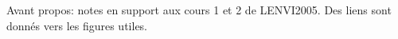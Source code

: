 \documentclass[fleqn]{mc}
\begin{document}
\raggedright
\tableofcontents
\newpage

Avant propos: notes en support aux cours 1 et 2 de LENVI2005. Des liens sont donnés vers les figures utiles. 


\end{document}
